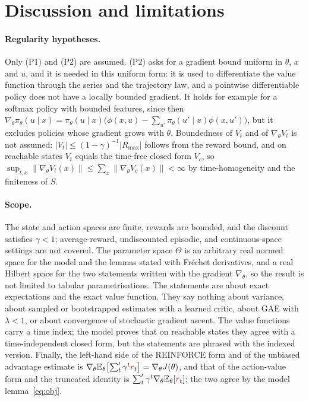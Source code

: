 \documentclass[11pt,a4paper]{article}
\newcommand{\E}{\mathbb{E}}
\newcommand{\rv}[1]{{\color{red}#1}}       %
\newcommand{\rw}{\rv{r}}
\newcommand{\grad}{\nabla_{\theta}}
\newcommand{\tsum}{\textstyle\sum'}
\begin{document}
\section{Discussion and limitations}
\label{sec:discussion}

\paragraph{Regularity hypotheses.}
Only (P1) and (P2) are assumed.
(P2) asks for a gradient bound uniform in $\theta$, $x$ and $u$, and it is needed in this uniform form: it is used to differentiate the value function through the series and the trajectory law, and a pointwise differentiable policy does not have a locally bounded gradient.
It holds for example for a softmax policy with bounded features, since then $\grad\pi_\theta(u\mid x)=\pi_\theta(u\mid x)\bigl(\phi(x,u)-\sum_{u'}\pi_\theta(u'\mid x)\phi(x,u')\bigr)$, but it excludes policies whose gradient grows with $\theta$.
Boundedness of $V_t$ and of $\grad V_t$ is not assumed: $|V_t|\le(1-\gamma)^{-1}|R_{\max}|$ follows from the reward bound, and on reachable states $V_t$ equals the time-free closed form $V_c$, so $\sup_{t,x}\|\grad V_t(x)\|\le\sum_x\|\grad V_c(x)\|<\infty$ by time-homogeneity and the finiteness of $S$.

\paragraph{Scope.}
The state and action spaces are finite, rewards are bounded, and the discount satisfies $\gamma<1$; average-reward, undiscounted episodic, and continuous-space settings are not covered.
The parameter space $\Theta$ is an arbitrary real normed space for the model and the lemmas stated with Fr\'echet derivatives, and a real Hilbert space for the two statements written with the gradient $\nabla_\theta$, so the result is not limited to tabular parametrisations.
The statements are about exact expectations and the exact value function.
They say nothing about variance, about sampled or bootstrapped estimates with a learned critic, about GAE with $\lambda<1$, or about convergence of stochastic gradient ascent.
The value functions carry a time index; the model proves that on reachable states they agree with a time-independent closed form, but the statements are phrased with the indexed version.
Finally, the left-hand side of the REINFORCE form and of the unbiased advantage estimate is $\grad\E_\theta\bigl[\tsum_t\gamma^t\rw_t\bigr]=\grad J(\theta)$, and that of the action-value form and the truncated identity is $\tsum_t\gamma^t\grad\E_\theta[\rw_t]$; the two agree by the model lemma~\eqref{eq:obj}.
\end{document}
